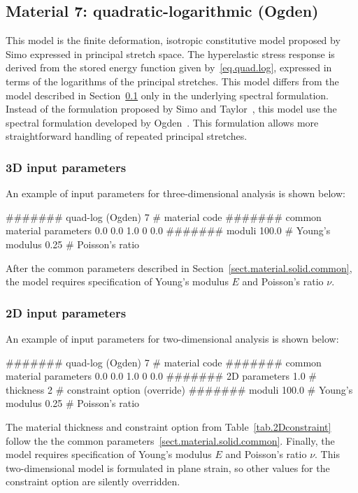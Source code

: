 \subsection{Material 7: quadratic-logarithmic (Ogden)}
\label{sect.mat.QuadLog.Ogden}
This model is the finite deformation, isotropic
constitutive model proposed by 
Simo \etal\cite{Simo1992} expressed in
principal stretch space.
The hyperelastic stress response is derived from the
stored energy function given by~\eqref{eq.quad.log}, 
expressed in terms of the
logarithms of the principal stretches.
This model differs from the model described in 
Section~\ref{sect.mat.QuadLog.Ogden} only in the underlying spectral
formulation. Instead of the formulation proposed by
Simo and Taylor~\cite{Simo1991}, this model use the spectral
formulation developed by Ogden~\cite{Ogden1983}.
This formulation allows more straightforward handling of 
repeated principal stretches.

\subsubsection{3D input parameters}
An example of input parameters for three-dimensional analysis is shown 
below:
\begin{inputfile}
####### quad-log (Ogden)
7     # material code
####### common material parameters
0.0    0.0    1.0
0      0.0
####### moduli
100.0 # Young's modulus
0.25  # Poisson's ratio
\end{inputfile}
After the common parameters described in 
Section~\ref{sect.material.solid.common}, the 
model requires specification of Young's modulus 
$E$ and Poisson's ratio $\nu$.

\subsubsection{2D input parameters}
An example of input parameters for two-dimensional analysis is shown 
below:
\begin{inputfile}
####### quad-log (Ogden)
7     # material code
####### common material parameters
0.0    0.0    1.0
0      0.0
####### 2D parameters
1.0   # thickness
2     # constraint option (override)
####### moduli
100.0 # Young's modulus
0.25  # Poisson's ratio
\end{inputfile}
The material thickness and 
constraint option from Table~\ref{tab.2Dconstraint} 
follow the the common 
parameters~\ref{sect.material.solid.common}.
Finally, the model requires specification of 
Young's modulus $E$ and Poisson's ratio $\nu$. 
This two-dimensional model is formulated in plane strain,
so other values for the constraint option are silently
overridden.


